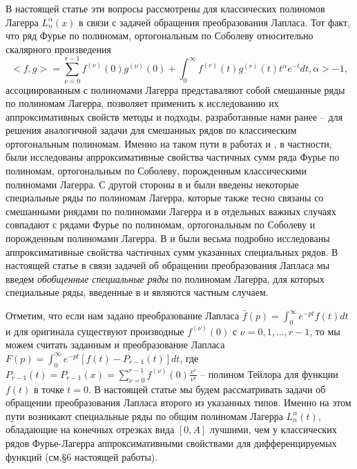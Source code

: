 В настоящей статье эти вопросы рассмотрены для классических полиномов Лагерра $L_n^\alpha(x)$ в связи с задачей обращения преобразования Лапласа. Тот факт, что ряд Фурье по полиномам, ортогональным по Соболеву относительно скалярного произведения
\begin{equation}\label{1.1}
<f,g>=\sum_{\nu=0}^{r-1}f^{(\nu)}(0)g^{(\nu)}(0)+\int_0^\infty f^{(r)}(t)g^{(r)}(t)t^\alpha e^{-t}dt, \alpha>-1,
\end{equation}
 ассоциированным с полиномами Лагерра представаляют собой смешанные ряды по полиномам Лагерра, позволяет применить к исследованию их аппроксимативных свойств  методы и подходы, разработанные нами ранее \cite{Shar13} -- \cite{Shar16} для решения аналогичной задачи для смешанных рядов по классическим ортогональным полиномам. Именно на таком пути в работах  \cite{Shar11} и \cite{Shar12}, в частности, были исследованы апрроксимативные свойства частичных сумм ряда Фурье по полиномам, ортогональным по Соболеву, порожденным классическими полиномами Лагерра. С другой стороны в \cite{Shar11} и \cite{Shar12} были введены некоторые специальные ряды по полиномам Лагерра, которые также тесно связаны со смешанными рнядами по полиномами Лагерра и в отдельных важных случаях совпадают с рядами Фурье по полиномам, ортогональным по Соболеву и порожденным полиномами Лагерра. В \cite{Shar11} и \cite{Shar12} были весьма подробно исследованы аппроксимативные свойства частичных сумм указанных специальных рядов. В настоящей статье в связи задачей об обращении преобразования Лапласа мы введем \textit{ обобщенные специальные ряды} по полиномам Лагерра,  для которых специальные ряды, введенные в \cite{Shar11} и \cite{Shar12} являются частным случаем.

 Отметим, что если нам задано преобразование Лапласа
$\bar f(p)=\int_0^\infty e^{-pt}f(t)dt$ и для оригинала существуют производные $f^{(\nu)}(0)$ с $\nu=0,1,\ldots, r-1$, то мы можем считать заданным и преобразование Лапласа $F(p)=\int_0^\infty e^{-pt}[f(t)-P_{r-1}(t)]dt$, где $P_{r-1}(t)=P_{r-1}(x)=\sum\nolimits_{\nu=0}^{r-1}f^{(\nu)}(0)\frac{x^\nu}{\nu!}$ -- полином Тейлора для функции $f(t)$ в точке $t=0$. В настоящей статье мы будем рассматривать задачи об обращении преобразования Лапласа второго из указанных типов. Именно на этом пути возникают специальные ряды по общим полиномам Лагерра $L_n^{\alpha}(t)$, обладающие на конечных отрезках вида $[0,A]$ лучшими, чем у классических рядов Фурье-Лагерра аппроксимативными свойствами для дифференцируемых функций   (см.\S 6 настоящей работы).



